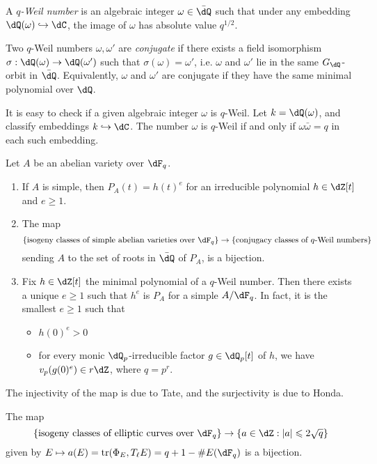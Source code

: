 \documentclass{article}
\begin{document}
\begin{definition}
A \emph{$q$-Weil number} is an algebraic integer $\omega\in \bar\dQ$ such that 
under any embedding $\dQ(\omega)\hookrightarrow\dC$, the image of $\omega$ has 
absolute value $q^{1/2}$. 
\end{definition}

Two $q$-Weil numbers $\omega,\omega'$ are \emph{conjugate} if there exists a 
field isomorphism $\sigma:\dQ(\omega) \to \dQ(\omega')$ such that 
$\sigma(\omega)=\omega'$, i.e. $\omega$ and $\omega'$ lie in the same 
$G_\dQ$-orbit in $\bar\dQ$. Equivalently, $\omega$ and $\omega'$ are conjugate 
if they have the same minimal polynomial over $\dQ$. 

It is easy to check if a given algebraic integer $\omega$ is $q$-Weil. Let 
$k=\dQ(\omega)$, and classify embeddings $k\hookrightarrow \dC$. The number 
$\omega$ is $q$-Weil if and only if $\omega\bar\omega = q$ in each such 
embedding.  

\begin{theorem}
Let $A$ be an abelian variety over $\dF_q$. 
\begin{enumerate}
  \item If $A$ is simple, then $P_A(t) = h(t)^e$ for an irreducible polynomial 
    $h\in \dZ[t]$ and $e\geqslant 1$.
  \item The map 
    \[
      \{\text{isogeny classes of simple abelian varieties over $\dF_q$}\} \to \{\text{conjugacy classes of $q$-Weil numbers}\}
    \]
    sending $A$ to the set of roots in $\bar\dQ$ of $P_A$, is a bijection. 
  \item Fix $h\in \dZ[t]$ the minimal polynomial of a $q$-Weil number. Then 
    there exists a unique $e\geqslant 1$ such that $h^e$ is $P_A$ for a simple 
    $A/\dF_q$. In fact, it is the smallest $e\geqslant 1$ such that 
    \begin{itemize}
      \item $h(0)^e>0$ 
      \item for every monic $\dQ_p$-irreducible factor $g\in \dQ_p[t]$ of $h$, 
        we have $v_p(g(0)^e)\in r\dZ$, where $q=p^r$. 
     \end{itemize}
\end{enumerate}
\end{theorem}

The injectivity of the map is due to Tate, and the surjectivity is due to 
Honda. 

\begin{corollary}
The map 
\[
  \{\text{isogeny classes of elliptic curves over $\dF_q$}\} \to \{a\in \dZ:|a|\leqslant 2\sqrt q\}
\]
given by $E\mapsto a(E)=\trace(\Phi_E,T_\ell E) = q+1-\# E(\dF_q)$ is a bijection. 
\end{corollary}
\end{document}
